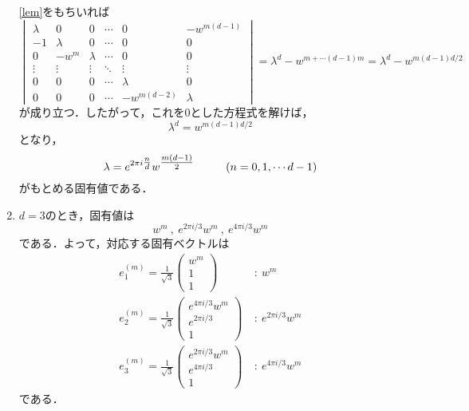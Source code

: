 \documentclass[a4paper,pdflatex,ja=standard]{bxjsarticle}
\begin{document}
\begin{enumerate}
  \eqref{lem}をもちいれば
  \begin{equation}
    \begin{vmatrix}
      \lambda & 0 & 0 & \cdots & 0 & -w^{m(d-1)} \\
      -1 & \lambda & 0 & \cdots & 0 & 0 \\
      0 & -w^{m} & \lambda & \cdots & 0 & 0 \\
      \vdots & \vdots & \vdots & \ddots & \vdots & \vdots \\
      0 & 0 & 0 & \cdots & \lambda & 0 \\
      0 & 0 & 0 & \cdots & -w^{m(d-2)} & \lambda 
    \end{vmatrix}
    =
    \lambda^{d}
    -w^{m+\cdots(d-1)m}
    =
    \lambda^{d}
    -
    w^{m(d-1)d/2}
  \end{equation}
  が成り立つ．したがって，これを$0$とした方程式を解けば，
  \begin{equation}
    \lambda^{d}
    =
    w^{m(d-1)d/2}
  \end{equation}
  となり，
  \begin{equation}
    \lambda
    =
    e^{2\pi i\tfrac{n}{d}}w^{\tfrac{m(d-1)}{2}}
    \hspace*{1cm} (n=0,1,\cdots d-1)
  \end{equation}
  がもとめる固有値である．

  \item 
  $d=3$のとき，固有値は
  \begin{equation}
    w^{m}
    \ ,\ 
    e^{2\pi i/3}w^{m}
    \ ,\ 
    e^{4\pi i/3}w^{m}
  \end{equation}
  である．よって，対応する固有ベクトルは
  \begin{align}
    e^{(m)}_{1}
    =
    \frac{1}{\sqrt{3}}
    \begin{pmatrix}
      w^{m} \\
      1 \\
      1
    \end{pmatrix}
    \ &:\ w^{m}
    \\
    e^{(m)}_{2}
    =
    \frac{1}{\sqrt{3}}
    \begin{pmatrix}
      e^{4\pi i/3}w^{m} \\
      e^{2\pi i/3} \\
      1
    \end{pmatrix}
    \ &:\ e^{2\pi i/3}w^{m}
    \\
    e^{(m)}_{3}
    =
    \frac{1}{\sqrt{3}}
    \begin{pmatrix}
      e^{2\pi i/3}w^{m} \\
      e^{4\pi i/3} \\
      1
    \end{pmatrix}
    \ &:\ e^{4\pi i/3}w^{m}
  \end{align}
  である．


\end{enumerate}
\end{document}
